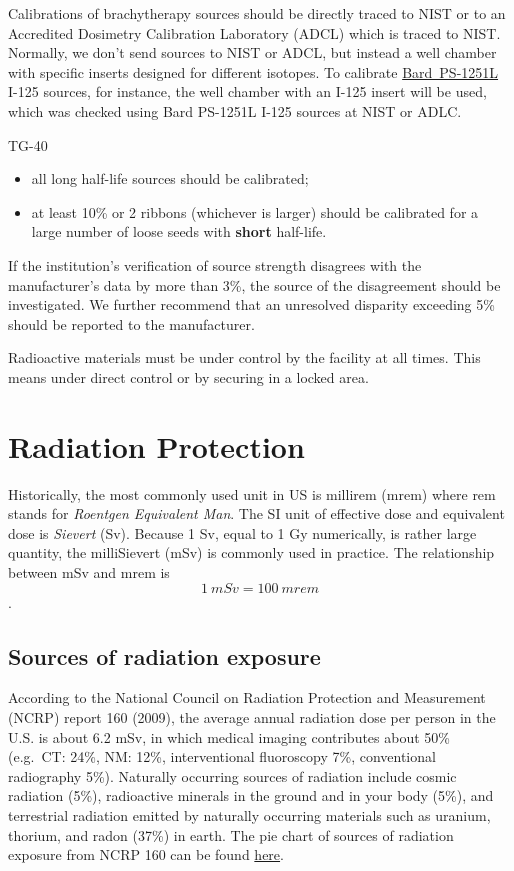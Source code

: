 \documentclass[]{book}
\providecommand{\tightlist}{%
  \setlength{\itemsep}{0pt}\setlength{\parskip}{0pt}}
\theoremstyle{definition}
\theoremstyle{definition}
\theoremstyle{definition}
\theoremstyle{remark}
\begin{document}
Calibrations of brachytherapy sources should be directly traced to NIST
or to an Accredited Dosimetry Calibration Laboratory (ADCL) which is
traced to NIST. Normally, we don't send sources to NIST or ADCL, but
instead a well chamber with specific inserts designed for different
isotopes. To calibrate
\href{http://www.bardmedical.com/products/prostate-health/brachytherapy/source-and-delivery-systems/iodine-125/}{Bard~PS-1251L}
I-125 sources, for instance, the well chamber with an I-125 insert will
be used, which was checked using Bard PS-1251L I-125 sources at NIST or
ADLC.

TG-40

\begin{itemize}
\tightlist
\item
  all long half-life sources should be calibrated;
\item
  at least 10\% or 2 ribbons (whichever is larger) should be calibrated
  for a large number of loose seeds with \textbf{short} half-life.
\end{itemize}

If the institution's verification of source strength disagrees with the
manufacturer's data by more than 3\%, the source of the disagreement
should be investigated. We further recommend that an unresolved
disparity exceeding 5\% should be reported to the manufacturer.

Radioactive materials must be under control by the facility at all
times. This means under direct control or by securing in a locked area.

\chapter{Radiation Protection}\label{protection}

Historically, the most commonly used unit in US is millirem (mrem) where
rem stands for \emph{Roentgen Equivalent Man}. The SI unit of effective
dose and equivalent dose is \emph{Sievert} (Sv). Because 1 Sv, equal to
1 Gy numerically, is rather large quantity, the milliSievert (mSv) is
commonly used in practice. The relationship between mSv and mrem is
\[1\ mSv = 100\ mrem\].

\section{Sources of radiation
exposure}\label{sources-of-radiation-exposure}

According to the National Council on Radiation Protection and
Measurement (NCRP) report 160 (2009), the average annual radiation dose
per person in the U.S. is about 6.2 mSv, in which medical imaging
contributes about 50\% (e.g.~CT: 24\%, NM: 12\%, interventional
fluoroscopy 7\%, conventional radiography 5\%). Naturally occurring
sources of radiation include cosmic radiation (5\%), radioactive
minerals in the ground and in your body (5\%), and terrestrial radiation
emitted by naturally occurring materials such as uranium, thorium, and
radon (37\%) in earth. The pie chart of sources of radiation exposure
from NCRP 160 can be found
\href{https://19january2017snapshot.epa.gov/radiation/radiation-sources-and-doses_.html}{here}.
\end{document}
